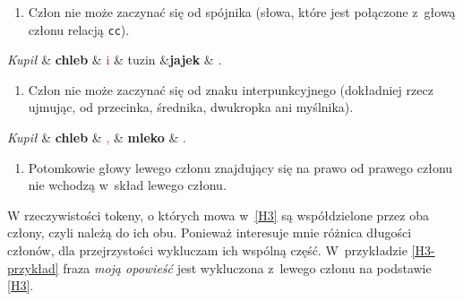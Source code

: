 \begin{enumerate}
\item[\namedlabel{H1}{(H1)}]
Człon nie może zaczynać się od spójnika (słowa, które jest połączone z~głową członu relacją \texttt{cc}).
\end{enumerate}

\begin{exe}
\ex  \label{H1-przykład}
\begin{dependency}[baseline=-\the\dimexpr\fontdimen22\textfont2\relax]
\begin{deptext}[column sep=1em, row sep=.1ex]
\emph{Kupił} \& \textbf{chleb} \& \textcolor{red}{i} \& tuzin \&\textbf{jajek} \& .  \\ 
\end{deptext}
\end{dependency}
\end{exe}

\begin{enumerate}
\item[\namedlabel{H2}{(H2)}]
Człon nie może zaczynać się od znaku interpunkcyjnego (dokładniej rzecz ujmując, od przecinka, średnika, dwukropka ani myślnika).
\end{enumerate}

\begin{exe}
\ex  \label{H2-przykład}
\begin{dependency}[baseline=-\the\dimexpr\fontdimen22\textfont2\relax]
\begin{deptext}[column sep=1em]
\emph{Kupił} \& \textbf{chleb} \& \textcolor{red}{,} \& \textbf{mleko} \& .  \\ 
\end{deptext}
\end{dependency}
\end{exe}

\begin{enumerate}
\item[\namedlabel{H3}{(H3)}]
Potomkowie głowy lewego członu znajdujący się na prawo od prawego członu nie wchodzą w~skład lewego członu.
\end{enumerate}

W rzeczywistości tokeny, o których mowa w~\ref{H3} są współdzielone przez oba człony, czyli należą do ich obu. Ponieważ interesuje mnie różnica długości członów, dla przejrzystości wykluczam ich wspólną część. W~przykładzie \eqref{H3-przykład} fraza \textit{moją opowieść} jest wykluczona z~lewego członu na podstawie \eqref{H3}.

